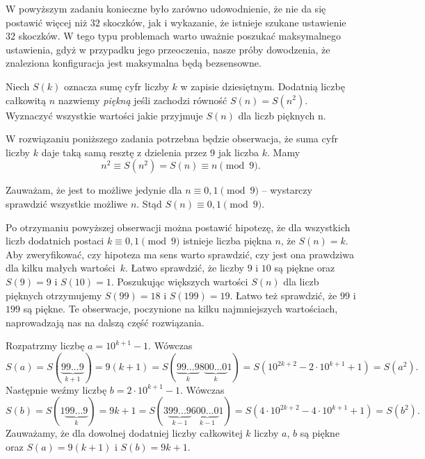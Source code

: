 \noindent
W powyższym zadaniu konieczne było zarówno udowodnienie, że nie da się postawić więcej niż $32$ skoczków, jak i wykazanie, że istnieje szukane ustawienie $32$ skoczków. W tego typu problemach warto uważnie poszukać maksymalnego ustawienia, gdyż w przypadku jego przeoczenia, nasze próby dowodzenia, że znaleziona konfiguracja jest maksymalna będą bezsensowne. 

\vspace{10px}


\noindent
Niech $S(k)$ oznacza sumę cyfr liczby $k$ w zapisie dziesiętnym. Dodatnią liczbę całkowitą $n$ nazwiemy \textit{piękną} jeśli zachodzi równość $S(n) = S(n^2)$. Wyznaczyć wszystkie wartości jakie przyjmuje $S(n)$ dla liczb pięknych n.

\newpage


\noindent
W rozwiązaniu poniższego zadania potrzebna będzie obserwacja, że suma cyfr liczby $k$ daje taką samą resztę z dzielenia przez $9$ jak liczba $k$. Mamy
\[
    n^2 \equiv S(n^2) = S(n) \equiv n \pmod{9}.
\]

\noindent
Zauważam, że jest to możliwe jedynie dla $n \equiv 0, 1 \pmod{9}$ -- wystarczy sprawdzić wszystkie możliwe $n$. Stąd $S(n) \equiv 0, 1 \pmod{9}$.

\vspace{5px}

\noindent
Po otrzymaniu powyższej obserwacji można postawić hipotezę, że dla wszystkich liczb dodatnich postaci $k \equiv 0, 1 \pmod{9}$ istnieje liczba piękna $n$, że $S(n) = k$. Aby zweryfikować, czy hipoteza ma sens warto sprawdzić, czy jest ona prawdziwa dla kilku małych wartości~$k$. Łatwo sprawdzić, że liczby $9$ i $10$ są piękne oraz $S(9) = 9$ i $S(10) = 1$. Poszukując większych wartości $S(n)$ dla liczb pięknych otrzymujemy $S(99) = 18$ i ${S(199) = 19}$. Łatwo też sprawdzić, że $99$ i $199$ są piękne. Te obserwacje, poczynione na kilku najmniejszych wartościach, naprowadzają nas na dalszą część rozwiązania.

\vspace{5px}

\noindent
Rozpatrzmy liczbę $a = 10^{k + 1} - 1$. Wówczas
\[
    S(a) = S(\underbrace{99...9}_{k+1}) = 9(k + 1) = S(\underbrace{99...9}_{k}8\underbrace{00...0}_{k}1) = S(10^{2k + 2} - 2\cdot 10^{k + 1} + 1) = S(a^2).
\]
Następnie weźmy liczbę $b = 2 \cdot 10^{k + 1} - 1$. Wówczas
\[
    S(b) = S(1\underbrace{99...9}_{k}) = 9k + 1 = S(3\underbrace{99...9}_{k-1}6\underbrace{00...0}_{k-1}1) = S(4\cdot 10^{2k + 2} - 4\cdot 10^{k + 1} + 1) = S(b^2).
\]
Zauważamy, że dla dowolnej dodatniej liczby całkowitej $k$ liczby $a$, $b$ są piękne oraz ${S(a) = 9(k + 1)}$ i $S(b) = 9k + 1$.

